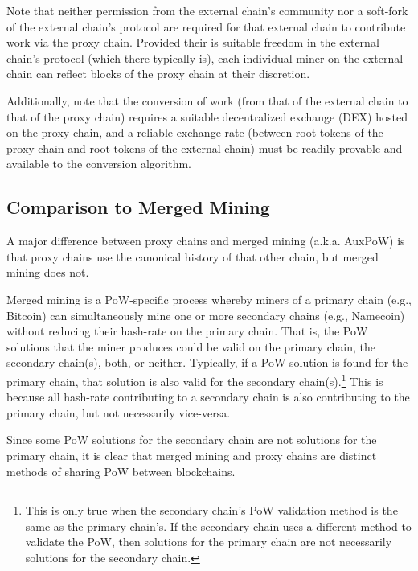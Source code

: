 \documentclass[a4paper,]{article}
\begin{document}
Note that neither permission from the external chain's community nor a soft-fork of the external chain's protocol are required for that external chain to contribute work via the proxy chain.
Provided their is suitable freedom in the external chain's protocol (which there typically is), each individual miner on the external chain can reflect blocks of the proxy chain at their discretion.

Additionally, note that the conversion of work (from that of the external chain to that of the proxy chain) requires a suitable decentralized exchange (DEX) hosted on the proxy chain, and a reliable exchange rate (between root tokens of the proxy chain and root tokens of the external chain) must be readily provable and available to the conversion algorithm.


\subsection{Comparison to Merged Mining}

A major difference between proxy chains and merged mining (a.k.a. AuxPoW) is that proxy chains use the canonical history of that other chain, but merged mining does not.

Merged mining is a PoW-specific process whereby miners of a primary chain (e.g., Bitcoin) can simultaneously mine one or more secondary chains (e.g., Namecoin) without reducing their hash-rate on the primary chain.
That is, the PoW solutions that the miner produces could be valid on the primary chain, the secondary chain(s), both, or neither.
Typically, if a PoW solution is found for the primary chain, that solution is also valid for the secondary chain(s).\footnote{
  This is only true when the secondary chain's PoW validation method is the same as the primary chain's.
  If the secondary chain uses a different method to validate the PoW, then solutions for the primary chain are not necessarily solutions for the secondary chain.
}
This is because all hash-rate contributing to a secondary chain is also contributing to the primary chain, but not necessarily vice-versa.

Since some PoW solutions for the secondary chain are not solutions for the primary chain, it is clear that merged mining and proxy chains are distinct methods of sharing PoW between blockchains.


\end{document}
